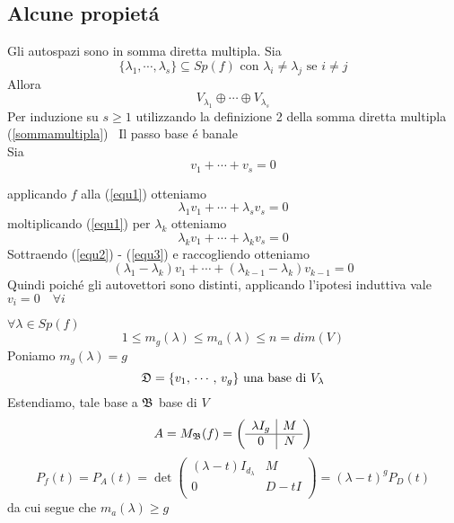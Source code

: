 \subsection{Alcune propiet\'a}
\begin{prop}Gli autospazi sono in somma diretta multipla.
Sia $$\{ \lambda_1,\cdots, \lambda_s \} \subseteq Sp(f) \text{ con }\lambda_i \neq \lambda_j  \text{ se }  i\neq j$$
Allora $$ V_{\lambda_1} \oplus \cdots \oplus V_{\lambda_s} $$
\proof Per induzione su $s\geq 1 $ utilizzando  la definizione 2 della somma diretta multipla (\ref{sommamultipla}) \
Il passo base \'e banale \\
Sia 
\begin{equation} \label{equ1}
v_1 + \cdots + v_s=0 
\end{equation} 

applicando $f$  alla (\ref{equ1}) otteniamo 
\begin{equation}\label{equ2}
 \lambda_1 v_1 + \cdots + \lambda_s v_s=0
\end{equation}
 moltiplicando (\ref{equ1}) per $\lambda_k$ otteniamo 
 \begin{equation} \label{equ3}
\lambda_k v_1 + \cdots + \lambda_k v_s=0 
 \end{equation}
Sottraendo (\ref{equ2}) - (\ref{equ3})  e raccogliendo otteniamo 
$$ ( \lambda_1 -\lambda_k) v_1 + \cdots + ( \lambda_{k-1} - \lambda_k) v_{k-1} =0$$
Quindi poich\'e gli autovettori sono distinti, applicando l'ipotesi induttiva vale
$v_i=0 \quad \forall i $
\end{prop}

\spazio

\begin{prop}\label{molt_alg_e_geo}
$ \forall \lambda \in Sp(f) $
$$ 1\leq m_g(\lambda) \leq m_a(\lambda) \leq n=dim(V) $$
\proof  Poniamo $m_g(\lambda) = g$
$$\mathfrak{D}=\{ v_1 , \, \cdots , \, v_{g} \} \text{ una base di } V_\lambda $$
Estendiamo, tale base a $\mathfrak{B}$  base di $V$ 
$$ A= M_{\mathfrak{B}} (f)= 
\left (
\begin{array}{c|c}
\lambda I_{g}  & M \\
\hline
0 & N \\
\end{array}
\right )$$
$$P_f(t)=P_A(t)=\det  \left (
\begin{array}{c|c}
(\lambda -t ) I_{d_\lambda}  & M \\
\hline
0 & D -t  I  \\
\end{array}
\right )=( \lambda -t )^{g} P_D(t) $$
da cui segue che $m_a(\lambda) \geq  g$
\endproof
\end{prop}
\newpage
